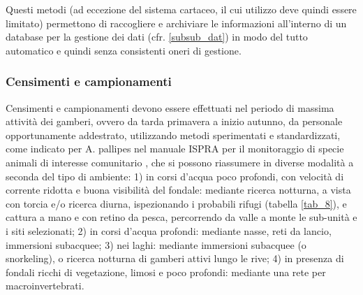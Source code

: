 \documentclass[11pt,a4paper,italian,twoside,openany]{memoir}
\begin{document}
Questi metodi (ad eccezione del sistema cartaceo, il cui utilizzo deve quindi essere limitato) permettono di raccogliere e archiviare le informazioni all'interno di un database per la gestione dei dati (cfr. \ref{subsub_dat}) in modo del tutto automatico e quindi senza consistenti oneri di gestione.
 
\subsubsection{Censimenti e campionamenti}
\label{subsub_cens}
Censimenti e campionamenti devono essere effettuati nel periodo di massima attività dei gamberi, ovvero da tarda primavera a inizio autunno, da personale opportunamente addestrato, utilizzando metodi sperimentati e standardizzati, come indicato per A. pallipes nel manuale ISPRA per il monitoraggio di specie animali di interesse comunitario \cite{Scalici 2016}, che si possono riassumere in diverse modalità a seconda del tipo di ambiente: 1) in corsi d'acqua poco profondi, con velocità di corrente ridotta e buona visibilità del fondale: mediante ricerca notturna, a vista con torcia e/o ricerca diurna, ispezionando i probabili rifugi (tabella \ref{tab_8}), e cattura a mano e con retino da pesca, percorrendo da valle a monte le sub-unità e i siti selezionati; 2) in corsi d'acqua profondi: mediante nasse, reti da lancio, immersioni subacquee; 3) nei laghi: mediante immersioni subacquee (o snorkeling), o ricerca notturna di gamberi attivi lungo le rive; 4) in presenza di fondali ricchi di vegetazione, limosi e poco profondi: mediante una rete per macroinvertebrati.
\end{document}
